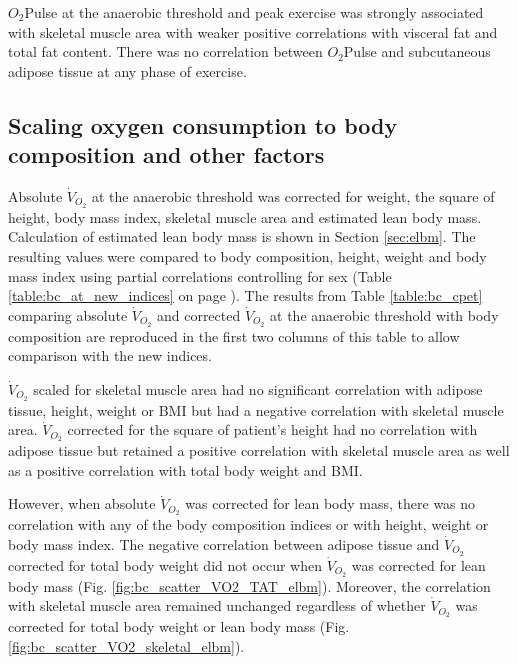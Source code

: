 $O_2$Pulse at the anaerobic threshold and peak exercise was strongly associated with skeletal muscle area with weaker positive correlations with visceral fat and total fat content. 
There was no correlation between $O_2$Pulse and subcutaneous adipose tissue at any phase of exercise.



\clearpage
\subsection{Scaling oxygen consumption to body composition and other factors}
Absolute $\dot{V}_{O_2}$ at the anaerobic threshold was corrected for weight, the square of height, body mass index, skeletal muscle area and estimated lean body mass. Calculation of estimated lean body mass is shown in Section \ref{sec:elbm}.
The resulting values were compared to body composition, height, weight and body mass index using partial correlations controlling for sex (Table \ref{table:bc_at_new_indices} on page \pageref{table:bc_at_new_indices}). 
The results from Table \ref{table:bc_cpet} comparing absolute $\dot{V}_{O_2}$ and corrected $\dot{V}_{O_2}$ at the anaerobic threshold with body composition are reproduced in the first two columns of this table to allow comparison with the new indices. 

$\dot{V}_{O_2}$ scaled for skeletal muscle area had no significant correlation with adipose tissue, height, weight or BMI but had a negative correlation with skeletal muscle area. 
$\dot{V}_{O_2}$ corrected for the square of patient's height had no correlation with adipose tissue but retained a positive correlation with skeletal muscle area as well as a positive correlation with total body weight and BMI. 

However, when absolute $\dot{V}_{O_2}$ was corrected for lean body mass, there was no correlation with any of the body composition indices or with height, weight or body mass index. 
The negative correlation between adipose tissue and $\dot{V}_{O_2}$ corrected for total body weight did not occur when $\dot{V}_{O_2}$ was corrected for lean body mass (Fig. \ref{fig:bc_scatter_VO2_TAT_elbm}). 
Moreover, the correlation with skeletal muscle area remained unchanged regardless of whether $\dot{V}_{O_2}$ was corrected for total body weight or lean body mass (Fig. \ref{fig:bc_scatter_VO2_skeletal_elbm}).


